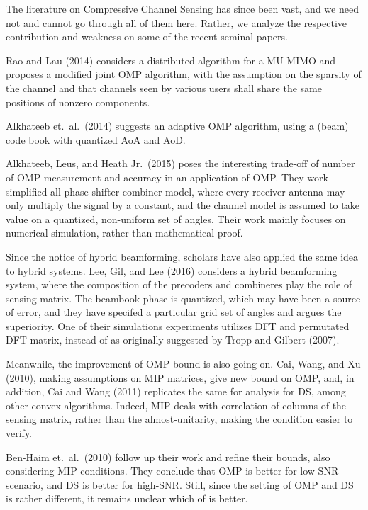 \stopsection

\startsection [title={Further Development}]

The literature on Compressive Channel Sensing has since been vast, and we need not and cannot go through all of them here.
Rather, we analyze the respective contribution and weakness on some of the recent seminal papers.

Rao and Lau (2014) considers a distributed algorithm for a MU-MIMO and proposes a modified joint OMP algorithm, with the assumption on the sparsity of the channel and that channels seen by various users shall share the same positions of nonzero components.

Alkhateeb et.\ al.\ (2014) suggests an adaptive OMP algorithm, using a (beam) code book with quantized AoA and AoD.

Alkhateeb, Leus, and Heath Jr.\ (2015) poses the interesting trade-off of number of OMP measurement and accuracy in an application of OMP.
They work simplified all-phase-shifter combiner model, where every receiver antenna may only multiply the signal by a constant, and the channel model is assumed to take value on a quantized, non-uniform set of angles.
Their work mainly focuses on numerical simulation, rather than mathematical proof.

Since the notice of hybrid beamforming, scholars have also applied the same idea to hybrid systems.
Lee, Gil, and Lee (2016) considers a hybrid beamforming system, where the composition of the precoders and combineres play the role of sensing matrix.
The beambook phase is quantized, which may have been a source of error, and they have specifed a particular grid set of angles and argues the superiority.
One of their simulations experiments utilizes DFT and permutated DFT matrix, instead of as originally suggested by Tropp and Gilbert (2007).

Meanwhile, the improvement of OMP bound is also going on.
Cai, Wang, and Xu (2010), making assumptions on MIP matrices, give new bound on OMP, and, in addition, Cai and Wang (2011) replicates the same for analysis for DS, among other convex algorithms.
Indeed, MIP deals with correlation of columns of the sensing matrix, rather than the almost-unitarity, making the condition easier to verify.

Ben-Haim et.\ al.\ (2010) follow up their work and refine their bounds, also considering MIP conditions.
They conclude that OMP is better for low-SNR scenario, and DS is better for high-SNR.
Still, since the setting of OMP and DS is rather different, it remains unclear which of is better.

